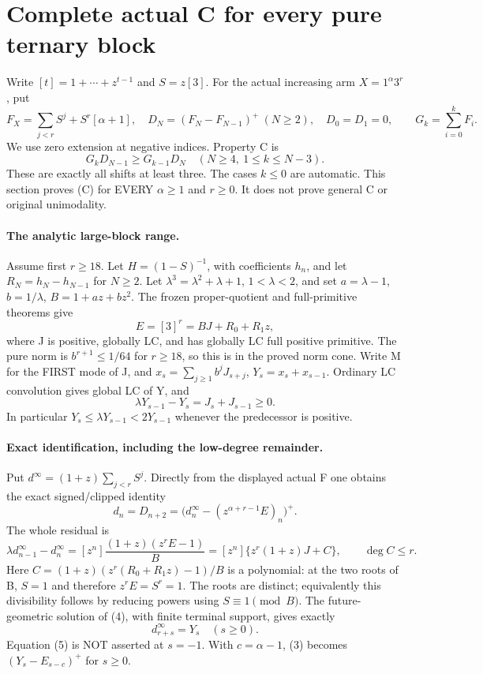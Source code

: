 \section{Complete actual C for every pure ternary block}
Write $[t]=1+\cdots+z^{t-1}$ and $S=z[3]$.
For the actual increasing arm $X=1^\alpha3^r$, put
\[
 F_X=\sum_{j<r}S^j+S^r[\alpha+1],\quad
 D_N=(F_N-F_{N-1})^+\ (N\ge2),\quad D_0=D_1=0,
 \qquad G_k=\sum_{i=0}^kF_i.
\]
We use zero extension at negative indices. Property C is
\[
 G_kD_{N-1}\ge G_{k-1}D_N
       \quad(N\ge4,\ 1\le k\le N-3).                 \tag{C}
\]
These are exactly all shifts at least three. The cases $k\le0$
are automatic. This section proves (C) for EVERY $\alpha\ge1$
and $r\ge0$. It does not prove general C or original unimodality.

\paragraph{The analytic large-block range.}
Assume first $r\ge18$. Let $H=(1-S)^{-1}$, with coefficients
$h_n$, and let $R_N=h_N-h_{N-1}$ for $N\ge2$. Let
$\lambda^3=\lambda^2+\lambda+1$, $1<\lambda<2$, and set
$a=\lambda-1$, $b=1/\lambda$, $B=1+az+bz^2$.
The frozen proper-quotient and full-primitive theorems give
\[
 E=[3]^r=BJ+R_0+R_1z,                              \tag{1}
\]
where J is positive, globally LC, and has globally LC full positive
primitive. The pure norm is $b^{r+1}\le1/64$ for $r\ge18$,
so this is in the proved norm cone. Write M for the FIRST mode of J,
and $x_s=\sum_{j\ge1}b^jJ_{s+j}$, $Y_s=x_s+x_{s-1}$.
Ordinary LC convolution gives global LC of Y, and
\[
                \lambda Y_{s-1}-Y_s=J_s+J_{s-1}\ge0. \tag{2}
\]
In particular $Y_s\le\lambda Y_{s-1}<2Y_{s-1}$ whenever
the predecessor is positive.

\paragraph{Exact identification, including the low-degree remainder.}
Put $d^\infty=(1+z)\sum_{j<r}S^j$. Directly from the displayed
actual F one obtains the exact signed/clipped identity
\[
 d_n=D_{n+2}
   =\bigl(d^\infty_n-(z^{\alpha+r-1}E)_n\bigr)^+.
                                                               \tag{3}
\]
The whole residual is
\[
 \lambda d^\infty_{n-1}-d^\infty_n
 =[z^n]\frac{(1+z)(z^rE-1)}{B}
 =[z^n]\{z^r(1+z)J+C\},\qquad \deg C\le r.       \tag{4}
\]
Here $C=(1+z)(z^r(R_0+R_1z)-1)/B$ is a polynomial: at the
two roots of B, $S=1$ and therefore $z^rE=S^r=1$.
The roots are distinct; equivalently this divisibility follows by
reducing powers using $S\equiv1\pmod B$.
The future-geometric solution of (4), with finite terminal support,
gives exactly
\[
                  d^\infty_{r+s}=Y_s\quad(s\ge0).     \tag{5}
\]
Equation (5) is NOT asserted at $s=-1$. With $c=\alpha-1$,
(3) becomes $(Y_s-E_{s-c})^+$ for $s\ge0$.

